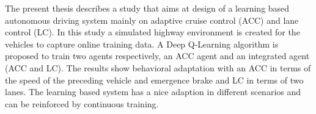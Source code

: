 \begin{sloppypar}

The present thesis describes a study that aims at design of a learning based autonomous driving system mainly on adaptive cruise control (ACC) and lane control (LC). In this study a simulated highway environment is created for the vehicles to capture online training data. A Deep Q-Learning algorithm is proposed to train two agents respectively, an ACC agent and an integrated agent (ACC and LC). The results show behavioral adaptation with an ACC in terms of the speed of the preceding vehicle and emergence brake and LC in terms of two lanes. The learning based system has a nice adaption in different scenarios and can be reinforced by continuous training.

\newpage
\end{sloppypar}
%
%

